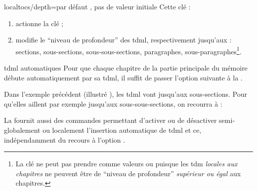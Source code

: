 {%
  \begin{docKey}[][doc
    new=2016-10-30]{localtocs/depth}{=\textbar{}\textbar{}\textbar{}\textbar{}}{par
      défaut , pas de valeur initiale}
    Cette clé :
    \begin{enumerate}
    \item actionne la clé  ;
    \item modifie le \enquote{niveau de profondeur} des \gls{tdml},
      respectivement jusqu'aux : sections, sous-sections, sous-sous-sections,
      paragraphes, sous-paragraphes\footnote{La clé  ne
        peut pas prendre comme valeurs  ou 
        puisque les \gls{tdm} \emph{locales aux chapitres} ne peuvent
        être de \enquote{niveau de profondeur} \emph{supérieur ou égal} aux
        chapitres.}.
    \end{enumerate}

\end{docKey}
}

\begin{dbexample}{\gls{tdml} automatiques}{}
  Pour que chaque chapitre de la partie principale du mémoire débute
  automatiquement par sa \gls{tdml}, il suffit de passer l'option suivante à la
  \yatCl{}.

  Dans l'exemple précédent (illustré ), les \gls{tdml}
  vont jusqu'aux sous-sections. Pour qu'elles aillent par exemple jusqu'aux
  sous-sous-sections, on recourra à :
\end{dbexample}

La \yatCl{} fournit aussi des commandes permettant d'activer ou de désactiver
semi-globalement ou localement l'insertion automatique de \gls{tdml} et ce,
indépendamment du recours à l'option .

